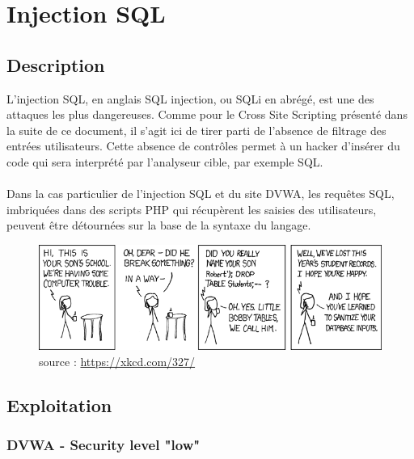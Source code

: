
\newpage
\section{Injection SQL }


\subsection{Description}




L'injection SQL, en anglais SQL  injection, ou SQLi en abrégé, est une des attaques les plus dangereuses. Comme pour le Cross Site Scripting présenté dans la suite de ce document, il s'agit ici de tirer parti de l'absence de filtrage des entrées utilisateurs. Cette absence de contrôles permet à un hacker d'insérer du code qui sera interprété par l'analyseur cible, par exemple SQL.




\paragraph{}
Dans la cas particulier de l'injection SQL et du site DVWA, les requêtes SQL, imbriquées dans des scripts PHP qui récupèrent les saisies des utilisateurs, peuvent être détournées sur la base de la syntaxe du langage. 

\begin{figure}[!h]
	\begin{center}
		\includegraphics[scale=0.72]{images/bd.png}
		\caption{source : \url{https://xkcd.com/327/}}
	\end{center}
\end{figure}


\subsection{Exploitation}

\subsubsection{DVWA - Security level "low"}


